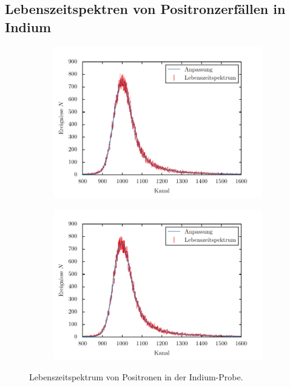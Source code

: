 \documentclass[11pt, a4paper]{article}
\numberwithin{equation}{section}
\begin{document}
\begin{appendix}
\newpage
\section{Lebenszeitspektren von Positronzerfällen in Indium}
\label{app:spektren}
\begin{figure}[h!]
	\begin{subfigure}{\textwidth}
		\centering
		\includegraphics{./figures/lifetimes/50_grad.pdf}
	\end{subfigure}
	\begin{subfigure}{\textwidth}
		\centering
		\includegraphics{./figures/lifetimes/62_grad.pdf}
	\end{subfigure}
	\caption{Lebenszeitspektrum von Positronen in der Indium-Probe.}
\end{figure}


\end{appendix}
\end{document}
